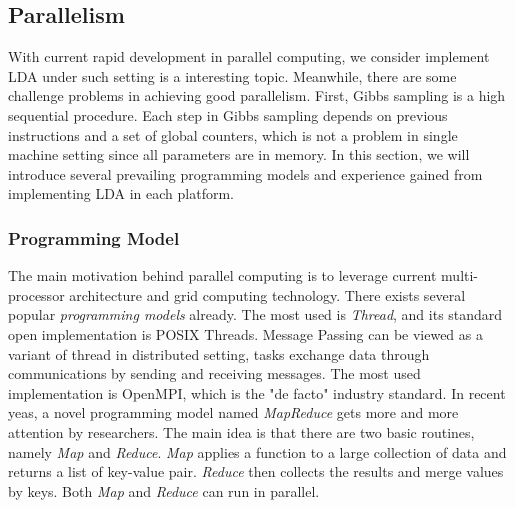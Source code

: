 \subsection{Parallelism}
With current rapid development in parallel computing, we consider implement LDA under such setting is a interesting topic. Meanwhile, there are some challenge problems in achieving good parallelism. First, Gibbs sampling is a high sequential procedure. Each step in Gibbs sampling depends on previous instructions and a set of global counters, which is not a problem in single machine setting since all parameters are in memory. In this section, we will introduce several prevailing programming models and experience gained from implementing LDA in each platform. 

\subsubsection{Programming Model}
The main motivation behind parallel computing is to leverage current multi-processor architecture and grid computing technology. There exists several popular \emph{programming models} already. The most used is \emph{Thread}, and its standard open implementation is POSIX Threads\cite{butenhof1997programming}. Message Passing can be viewed as a variant of thread in distributed setting, tasks exchange data through communications by sending and receiving messages. The most used implementation is OpenMPI\cite{lusk2009mpi}, which is the "de facto" industry standard. In recent yeas, a novel programming model named \emph{MapReduce}\cite{dean2008mapreduce} gets more and more attention by researchers. The main idea is that there are two basic routines, namely \emph{Map} and \emph{Reduce}. \emph{Map} applies a function to a large collection of data and returns a list of key-value pair. \emph{Reduce} then collects the results and merge values by keys. Both \emph{Map} and \emph{Reduce} can run in parallel. 


